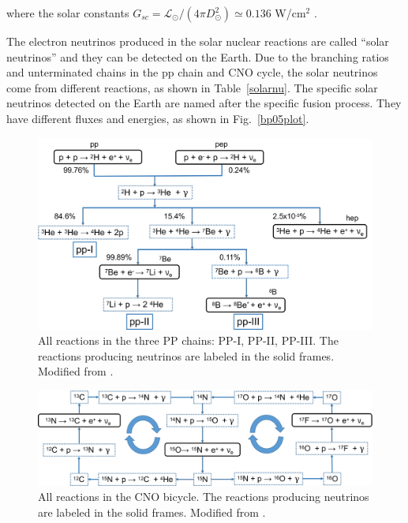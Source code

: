 where the solar constants $G_{sc}=\mathcal{L}_\odot/(4\pi D^2_\odot)\simeq 0.136$ W/cm$^2$ \cite{suekane2015neutrino}. 

The electron neutrinos produced in the solar nuclear reactions are called ``solar neutrinos'' and they can be detected on the Earth. Due to the branching ratios and unterminated chains in the pp chain and CNO cycle, the solar neutrinos come from different reactions, as shown in Table~\ref{solarnu}. The specific solar neutrinos detected on the Earth are named after the specific fusion process\cite{haxton2013solar}. They have different fluxes and energies, as shown in Fig.~\ref{bp05plot}\cite{bahcall2005new}.

\begin{figure}[htbp]
	\centering	
	\includegraphics[width=14cm]{ppChain.png}
	\caption[All reactions in the three PP chains.]{All reactions in the three PP chains: PP-I, PP-II, PP-III. The reactions producing neutrinos are labeled in the solid frames. Modified from \cite{oberauer2020solar}.}
	\label{ppChain}
\end{figure}

\begin{figure}[htbp]
	\centering	
	\includegraphics[width=14cm]{CNOcycle.png}
	\caption[All reactions in the CNO bicycle.]{All reactions in the CNO bicycle. The reactions producing neutrinos are labeled in the solid frames. Modified from \cite{oberauer2020solar}.}
	\label{CNOcycle}
\end{figure}

